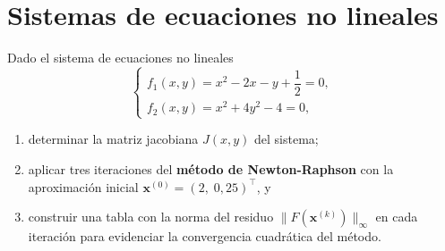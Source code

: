 \documentclass[a4,11pt]{aleph-notas}
\begin{document}
\encabezado

\section{Sistemas de ecuaciones no lineales}


\begin{ejer}
    Dado el sistema de ecuaciones no lineales
    \[
        \begin{cases}
            f_1(x,y) = x^2 - 2x - y + \dfrac{1}{2} = 0,\\[6pt]
            f_2(x,y) = x^2 + 4y^2 - 4 = 0,
        \end{cases}
    \]
    \begin{enumerate}
        \item determinar la matriz jacobiana $J(x,y)$ del sistema;
        \item aplicar tres iteraciones del \textbf{método de Newton-Raphson} con la
              aproximación inicial $\mathbf{x}^{(0)}=\!\left(2,\;0{,}25\right)^{\!\top}$, y
        \item construir una tabla con la norma del residuo
              $\bigl\|F\!\left(\mathbf{x}^{(k)}\right)\bigr\|_\infty$ en cada iteración
              para evidenciar la convergencia cuadrática del método.
    \end{enumerate}
\end{ejer}
\end{document}
